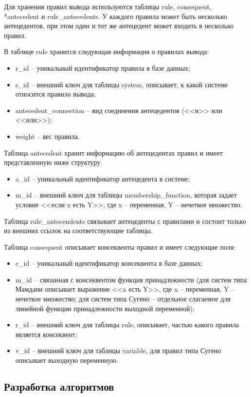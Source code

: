 Для хранения правил вывода используются таблицы rule, consequent, \\*antecedent и rule\_antecedents. У каждого правила может быть несколько антецедентов, при этом один и тот же антецедент может входить в несколько правил.

В таблице rule хранится следующая информация о правилах вывода:
\begin{itemize}
	\item r\_id -- уникальный идентификатор правила в базе данных;
	\item s\_id -- внешний ключ для таблицы system, описывает, к какой системе относится правило вывода;
	\item antecedent\_connection -- вид соединения антецедентов (<<и>> или <<или>>);
	\item weight -- вес правила.
\end{itemize}

Таблица antecedent хранит информацию об антецедентах правил и имеет представленную ниже структуру.
\begin{itemize}
	\item a\_id -- уникальный идентификатор антецедента в системе;
	\item m\_id -- внешний ключ для таблицы membership\_function, которая задает условие <<если x есть Y>>, где x -- переменная, Y -- нечеткое множество.
\end{itemize}

Таблица rule\_antecendents связывает антецеденты с правилами и состоит только из внешних ссылок на соответствующие таблицы.

Таблица consequent описывает консеквенты правил и имеет следующие поля:
\begin{itemize}
	\item c\_id -- уникальный идентификатор консеквента в базе данных;
	\item m\_id -- связанная с консеквентом функция принадлежности (для систем типа Мамдани описывает выражение <<x есть Y>>, где x -- переменная, Y -- нечеткое множество; для систем типа Сугено -- отдельное слагаемое для линейной функции принадлежности выходной переменной);
	\item r\_id -- внешний ключ для таблицы rule, описывает, частью какого правила является консеквент;
	\item v\_id -- внешний ключ для таблицы variable, для правил типа Сугено описывает выходную переменную.
\end{itemize}

\subsection{Разработка алгоритмов}

